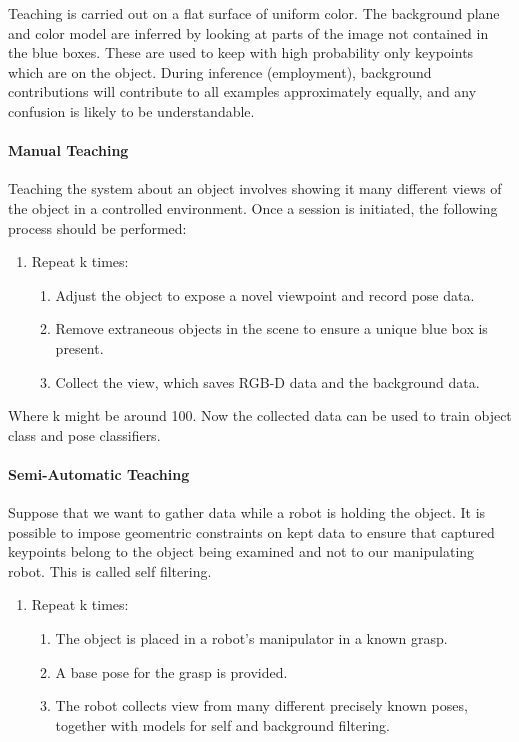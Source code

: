 \documentclass[12pt]{article}
\numberwithin{equation}{section}
\numberwithin{table}{section}
\numberwithin{figure}{section}
\begin{document}
Teaching is carried out on a flat surface of uniform color. The background plane
and color model are inferred by looking at parts of the image not contained in
the blue boxes. These are used to keep with high probability only keypoints which
are on the object. During inference (employment), background contributions will
contribute to all examples approximately equally, and any confusion is likely to
be understandable.

\paragraph{Manual Teaching}
Teaching the system about an object involves showing it many different views of
the object in a controlled environment. Once a session is initiated, the following
process should be performed:

\begin{enumerate}
  \item Repeat k times:
  \begin{enumerate}
    \item Adjust the object to expose a novel viewpoint and record pose data.
    \item Remove extraneous objects in the scene to ensure a unique blue box is present.
    \item Collect the view, which saves RGB-D data and the background data.
  \end{enumerate}
\end{enumerate}

Where k might be around 100. Now the collected data can be used to train object class
and pose classifiers.

\paragraph{Semi-Automatic Teaching}

Suppose that we want to gather data while a robot is holding the object. It is possible
to impose geomentric constraints on kept data to ensure that captured keypoints
belong to the object being examined and not to our manipulating robot. This is
called self filtering.


\begin{enumerate}
  \item Repeat k times:
  \begin{enumerate}
    \item The object is placed in a robot's manipulator in a known grasp.
    \item A base pose for the grasp is provided.
    \item The robot collects view from many different precisely known poses, together with models for self and background filtering.
  \end{enumerate}
\end{enumerate}
\end{document}
